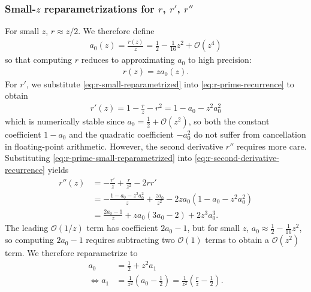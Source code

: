 \documentclass{article}
\begin{document}
\subsubsection{Small-$z$ reparametrizations for $r$, $r'$, $r''$}\label{sec:bessel-ratio-small-z}

For small $z$, $r \approx z/2$.
We therefore define
%
\begin{align}\label{eq:a0-small-z}
  a_0(z) = \frac{r(z)}{z} = \frac{1}{2} - \frac{1}{16}z^2 + \mathcal{O}(z^4)
\end{align}
%
so that computing $r$ reduces to approximating $a_0$ to high precision:
%
\begin{align}\label{eq:r-small-reparametrized}
  \boxed{r(z) = z a_0(z).}
\end{align}
%
For $r'$, we substitute \cref{eq:r-small-reparametrized} into \cref{eq:r-prime-recurrence} to obtain
%
\begin{align}\label{eq:r-prime-small-reparametrized}
  \boxed{r'(z) = 1 - \frac{r}{z} - r^2 = 1 - a_0 - z^2 a_0^2}
\end{align}
%
which is numerically stable since $a_0 = \frac{1}{2} + \mathcal{O}(z^2)$, so both the constant coefficient $1 - a_0$ and the quadratic coefficient $-a_0^2$ do not suffer from cancellation in floating-point arithmetic.
However, the second derivative $r''$ requires more care.
Substituting \cref{eq:r-prime-small-reparametrized} into \cref{eq:r-second-derivative-recurrence} yields
%
\begin{align}
  r''(z) & = -\frac{r'}{z} + \frac{r}{z^2} - 2 r r'                                             \\
         & = -\frac{1 - a_0 - z^2 a_0^2}{z} + \frac{z a_0}{z^2} -  2 z a_0(1 - a_0 - z^2 a_0^2) \\
         & = \frac{2 a_0 - 1}{z} + z a_0 (3 a_0 - 2) + 2 z^3 a_0^3.
\end{align}
%
The leading $\mathcal{O}(1/z)$ term has coefficient $2a_0 - 1$, but for small $z$, $a_0 \approx \frac{1}{2} - \frac{1}{16}z^2$, so computing $2a_0 - 1$ requires subtracting two $\mathcal{O}(1)$ terms to obtain a $\mathcal{O}(z^2)$ term.
We therefore reparametrize to
%
\begin{align}
  a_0                 & = \frac{1}{2} + z^2 a_1 \label{eq:a0-reparametrized}                                                          \\
  \Leftrightarrow a_1 & = \frac{1}{z^2} (a_0 - \frac{1}{2}) = \frac{1}{z^2} (\frac{r}{z} - \frac{1}{2}). \label{eq:a1-reparametrized}
\end{align}
\end{document}
